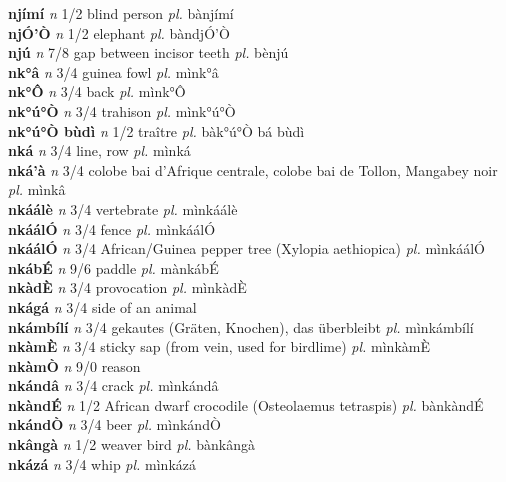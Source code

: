 \documentclass{article}
\begin{document}
{\bf njímí}  {\it n} 1/2 blind person {\it pl.} bànjímí         \\ 
{\bf njÓ'Ò}  {\it n} 1/2 elephant {\it pl.} bàndjÓ'Ò         \\ 
{\bf njú}  {\it n} 7/8 gap between incisor teeth {\it pl.} bènjú         \\ 
{\bf nk°â}  {\it n} 3/4 guinea fowl {\it pl.} mìnk°â         \\ 
{\bf nk°Ô}  {\it n} 3/4 back {\it pl.} mìnk°Ô         \\ 
{\bf nk°ú°Ò}  {\it n} 3/4 trahison {\it pl.} mìnk°ú°Ò         \\ 
{\bf nk°ú°Ò bùdì}  {\it n} 1/2 traître {\it pl.} bàk°ú°Ò bá bùdì         \\ 
{\bf nká}  {\it n} 3/4 line, row {\it pl.} mìnká         \\ 
{\bf nká'à}  {\it n} 3/4 colobe bai d'Afrique centrale, colobe bai de Tollon, Mangabey noir {\it pl.} mìnkâ         \\ 
{\bf nkáálè}  {\it n} 3/4 vertebrate {\it pl.} mìnkáálè         \\ 
{\bf nkáálÓ}  {\it n} 3/4 fence {\it pl.} mìnkáálÓ         \\ 
{\bf nkáálÓ}  {\it n} 3/4 African/Guinea pepper tree (Xylopia aethiopica) {\it pl.} mìnkáálÓ         \\ 
{\bf nkábÉ}  {\it n} 9/6 paddle {\it pl.} mànkábÉ         \\ 
{\bf nkàdÈ}  {\it n} 3/4 provocation {\it pl.} mìnkàdÈ         \\ 
{\bf nkágá}  {\it n} 3/4 side of an animal         \\ 
{\bf nkámbílí}  {\it n} 3/4 gekautes (Gräten, Knochen), das überbleibt {\it pl.} mìnkámbílí         \\ 
{\bf nkàmÈ}  {\it n} 3/4 sticky sap (from vein, used for birdlime) {\it pl.} mìnkàmÈ         \\ 
{\bf nkàmÒ}  {\it n} 9/0 reason         \\ 
{\bf nkándâ}  {\it n} 3/4 crack {\it pl.} mìnkándâ         \\ 
{\bf nkàndÉ}  {\it n} 1/2 African dwarf crocodile (Osteolaemus tetraspis) {\it pl.} bànkàndÉ         \\ 
{\bf nkándÒ}  {\it n} 3/4 beer {\it pl.} mìnkándÒ         \\ 
{\bf nkângà}  {\it n} 1/2 weaver bird {\it pl.} bànkângà         \\ 
{\bf nkázá}  {\it n} 3/4 whip {\it pl.} mìnkázá         \\ 
\end{document}
